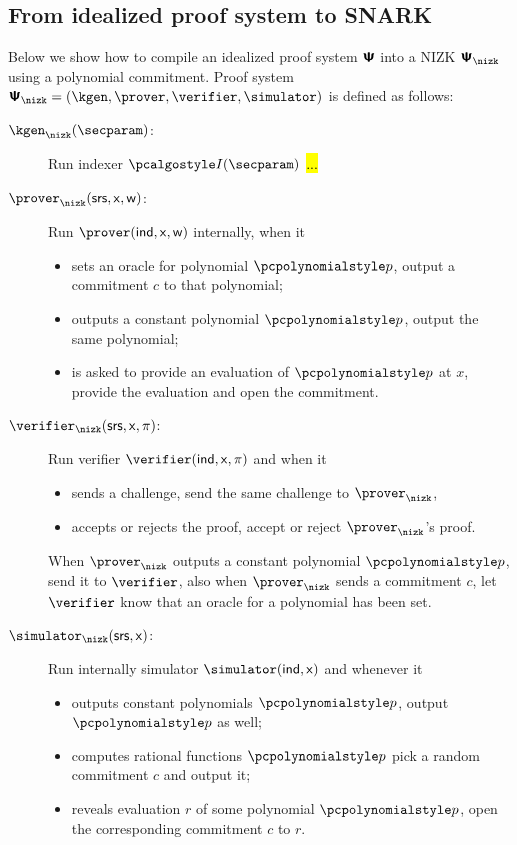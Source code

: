\documentclass[runningheads,11pt]{llncs}
\begin{document}
\subsection{From idealized proof system to SNARK}
Below we show how to compile an idealized proof system $\bm{\mathsf{\Psi}}$ into a NIZK $\PSc$ using
a polynomial commitment. Proof system
$\PSc = (\kgen, \prover, \verifier, \simulator)$ is defined as follows:
\begin{description}
\item[$\kgenc (\secparam)$:] Run indexer $\indexer (\secparam)$ \hl{...}
\item[$\proverc (\srs, \inp, \wit)$:] Run $\prover (\ind, \inp, \wit)$ internally, when it
  \begin{itemize}
  \item  sets an oracle for polynomial $\p{p}$, output a commitment $c$ to
    that polynomial;
  \item  outputs a constant polynomial $\p{p}$, output the same polynomial;
  \item  is asked to provide an evaluation of $\p{p}$ at $x$, provide the
    evaluation and open the commitment.
  \end{itemize}
\item[$\verifierc (\srs, \inp, \zkproof)$:] Run verifier
  $\verifier (\ind, \inp, \zkproof)$ and when it 
  \begin{itemize}
  \item sends a challenge, send the same challenge to $\proverc$,
  \item accepts or rejects the proof, accept or reject $\proverc$'s proof.
  \end{itemize}
  When $\proverc$ outputs a constant polynomial $\p{p}$, send it to $\verifier$, also
  when $\proverc$ sends a commitment $c$, let $\verifier$ know that an oracle for a
  polynomial has been set.
\item[$\simulatorc (\srs, \inp)$:] Run internally simulator $\simulator (\ind, \inp)$
  and whenever it
  \begin{itemize}
  \item outputs constant polynomials $\p{p}$, output $\p{p}$ as well;
  \item computes rational functions $\p{p}$ pick a random commitment $c$ and output
    it;
  \item reveals evaluation $r$ of some polynomial $\p{p}$, open the corresponding
    commitment $c$ to $r$.
  \end{itemize}
\end{description}
\end{document}

